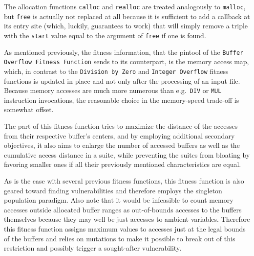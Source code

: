 The allocation functions \texttt{calloc} and \texttt{realloc} are treated analogously to \texttt{malloc}, but
\texttt{free} is actually not replaced at all because it is sufficient to add a callback at its entry site
(which, luckily, \pin guarantees to work) that will simply remove a triple with the \texttt{start} value equal
to the argument of \texttt{free} if one is found.

As mentioned previously, the fitness information, that the pintool of the \texttt{Buffer Overflow
Fitness Function} sends to its \java counterpart, is the memory access map, which, in contrast to the
\texttt{Division by Zero} and \texttt{Integer Overflow} fitness functions is updated in-place and not only
after the processing of an input file. Because memory accesses are much more numerous than e.g.\ \texttt{DIV}
or \texttt{MUL} instruction invocations, the reasonable choice in the memory-speed trade-off is somewhat offset.

The \java part of this fitness function tries to maximize the distance of the accesses from their
respective buffer's centers, and by employing additional secondary objectives, it also aims to enlarge the
number of accessed buffers as well as the cumulative access distance in a suite, while preventing the suites
from bloating by favoring smaller ones if all their previously mentioned characteristics are equal.

As is the case with several previous fitness functions, this fitness function is also geared toward finding
vulnerabilities and therefore employs the singleton population paradigm. Also note that it would be infeasible
to count memory accesses outside allocated buffer ranges as out-of-bounds accesses to the buffers themselves because they may well be
just accesses to ambient variables. Therefore this fitness function assigns maximum values to accesses just at
the legal bounds of the buffers and relies on mutations to make it possible to break out of this restriction
and possibly trigger a sought-after vulnerability.
